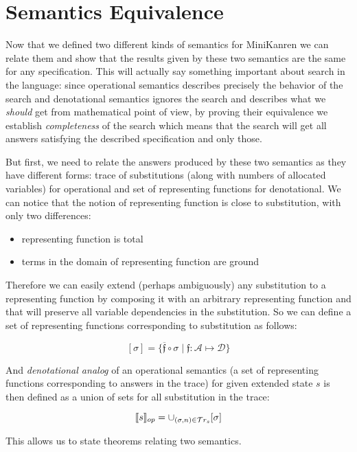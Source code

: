 \section{Semantics Equivalence}
\label{equivalence}

Now that we defined two different kinds of semantics for MiniKanren we can relate them and show that the results given by these two semantics are the same for any specification. This will actually say something important about search in the language: since operational semantics describes precisely the behavior of the search and denotational semantics ignores the search and describes what we \emph{should} get from mathematical point of view, by proving their equivalence we establish \emph{completeness} of the search which means that the search will get all answers satisfying the described specification and only those.

But first, we need to relate the answers produced by these two semantics as they have different forms: trace of substitutions (along with numbers of allocated variables) for operational and set of representing functions for denotational. We can notice that the notion of representing function is close to substitution, with only two differences:

\begin{itemize}
\item representing function is total
\item terms in the domain of representing function are ground
\end{itemize}

Therefore we can easily extend (perhaps ambiguously) any substitution to a representing function by composing it with an arbitrary representing function and that will preserve all variable dependencies in the substitution. So we can define a set of representing functions corresponding to substitution as follows:

\[
[\sigma] = \{\overline{\mathfrak f} \circ \sigma \mid \mathfrak{f}:\mathcal{A}\mapsto\mathcal{D}\}
\]

And \emph{denotational analog} of an operational semantics (a set of representing functions corresponding to answers in the trace) for given extended state $s$ is then defined as a union of sets for all substitution in the trace:

\[
\llbracket{s}\rrbracket_{op} = \cup_{(\sigma, n) \in \mathcal{T}r_{s}} [\sigma]
\]

This allows us to state theorems relating two semantics.

